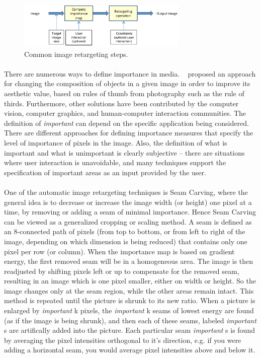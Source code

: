 \documentclass[conference]{acmsiggraph}
\begin{document}
\begin{figure}[ht]
  \centering
  \includegraphics[width=3.2in]{images/retargeting}
  \caption{Common image retargeting steps.}
\end{figure}

\paragraph{}
There are numerous ways to define importance in media. ~\cite{Liu2010} proposed an approach for changing the composition of objects in a given image in order to improve its aesthetic value, based on rules of thumb from photography such as the rule of thirds. Furthermore, other solutions have been contributed by the computer vision, computer graphics, and human-computer interaction
communities. The definition of \emph{important} can depend on the specific application being considered. There are different approaches for defining importance measures that specify the level of importance of pixels in the image. Also, the definition of what is important and what is unimportant is clearly subjective -- there are situations where user interaction is unavoidable, and many techniques support the specification of important areas as an input provided by the user.


\paragraph{}
One of the automatic image retargeting techniques is Seam Carving, where the general idea is to decrease or increase the image width (or height) one pixel at a time, by removing or adding a seam of minimal importance. Hence Seam Carving can be viewed as a generalized cropping or scaling method. A seam is defined as an 8-connected path of pixels (from top to bottom, or from left to right of the image, depending on which dimension is being reduced) that contains only one pixel per row (or column). When the importance map is based on gradient energy, the first removed seam will be in a homogeneous area. The image is then readjusted by shifting pixels left or up to compensate for the removed seam, resulting in an image which is one pixel smaller, either on width or height. So the image changes only at the seam region, while the other areas remain intact.  This method is repeated until the picture is shrunk to its new ratio.  When a picture is enlarged by \emph{important} k pixels, the \emph{important} k seams of lowest energy are found (as if the image is being shrunk), and then each of these seams, labeled \emph{important} s are artifically added into the picture.  Each particular seam \emph{important} s is found by averaging the pixel intensities orthogonal to it's direction, e.g. if you were adding a horizontal seam, you would average pixel intensities above and below it.  
\end{document}
